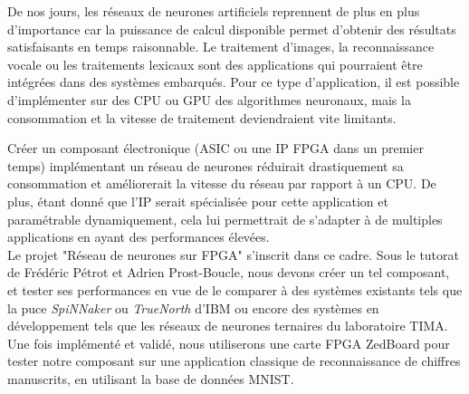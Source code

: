 De nos jours, les réseaux de neurones artificiels reprennent de plus en plus d'importance car la puissance de calcul disponible permet d'obtenir des résultats satisfaisants en temps raisonnable.
Le traitement d'images, la reconnaissance vocale ou les traitements lexicaux sont
des applications qui pourraient être intégrées dans des systèmes embarqués. Pour ce type d'application, il est possible
d'implémenter sur des CPU ou GPU des algorithmes neuronaux, mais la consommation et la vitesse de traitement deviendraient vite limitants.

Créer un composant électronique (ASIC ou une IP FPGA dans un premier temps) implémentant un réseau de neurones réduirait drastiquement sa consommation
et améliorerait la vitesse du réseau par rapport à un CPU.
De plus, étant donné que l'IP serait spécialisée pour cette application et paramétrable dynamiquement,
cela lui permettrait de s'adapter à de multiples applications en ayant des performances élevées.\\

Le projet "Réseau de neurones sur FPGA" s'inscrit dans ce cadre. Sous le tutorat
de Frédéric Pétrot et Adrien Prost-Boucle, nous devons créer un tel composant,
et tester ses performances en vue de le comparer à des systèmes existants tels
que la puce {\em SpiNNaker}\cite{painkras2013spinnaker} ou {\em TrueNorth}\cite{modha2014introducing} d'IBM ou encore des systèmes en développement
tels que les réseaux de neurones ternaires du laboratoire TIMA. Une fois
implémenté et validé, nous utiliserons une carte FPGA ZedBoard pour tester notre
composant sur une application classique de reconnaissance de chiffres manuscrits,
en utilisant la base de données MNIST\cite{lecun2010mnist}.
